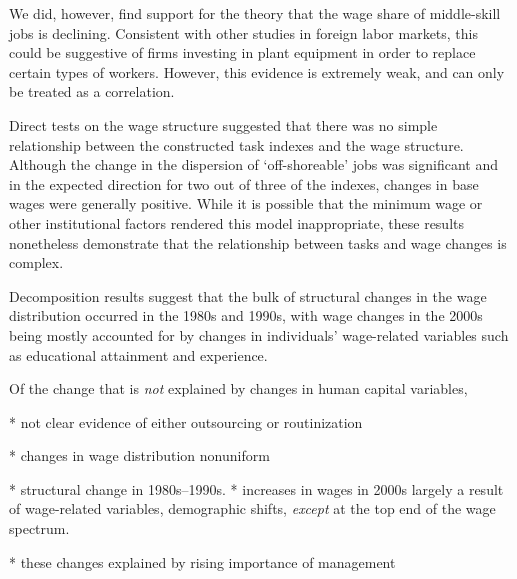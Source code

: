 We did, however, find support for the theory that the wage share of middle-skill jobs is declining. Consistent with other studies in foreign labor markets, this could be suggestive of firms investing in plant equipment in order to replace certain types of workers. However, this evidence is extremely weak, and can only be treated as a correlation.

Direct tests on the wage structure suggested that there was no simple relationship between the constructed task indexes and the wage structure. Although the change in the dispersion of `off-shoreable' jobs was significant and in the expected direction for two out of three of the indexes, changes in base wages were generally positive. While it is possible that the minimum wage or other institutional factors rendered this model inappropriate, these results nonetheless demonstrate that the relationship between tasks and wage changes is complex.

Decomposition results suggest that the bulk of structural changes in the wage distribution occurred in the 1980s and 1990s, with wage changes in the 2000s being mostly accounted for by changes in individuals' wage-related variables such as educational attainment and experience.

Of the change that is {\em not} explained by changes in human capital variables, 

* not clear evidence of either outsourcing or routinization

* changes in wage distribution nonuniform

* structural change in 1980s--1990s.
* increases in wages in 2000s largely a result of wage-related variables, demographic shifts, {\em except} at the top end of the wage spectrum.

* these changes explained by rising importance of management

